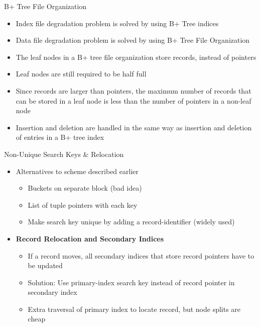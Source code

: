 \documentclass[aspectratio=169, xcolor=dvipsnames]{beamer}
\begin{document}
\begin{frame}{B+ Tree File Organization}
    \begin{itemize}[<+->]
        \item Index file degradation problem is solved by using B+ Tree indices
        \item Data file degradation problem is solved by using B+ Tree File Organization
        \item The leaf nodes in a B+ tree file organization store records, instead of pointers
        \item Leaf nodes are still required to be half full
        \item Since records are larger than pointers, the maximum number of records that can be stored in a leaf node is less than the number of pointers in a non-leaf node
        \item Insertion and deletion are handled in the same way as insertion and deletion of entries in a B+ tree index
    \end{itemize}
\end{frame}

\begin{frame}{Non-Unique Search Keys \& Relocation}
    \begin{itemize}[<+->]
        \item Alternatives to scheme described earlier
        \begin{itemize}
            \item Buckets on separate block (bad idea)
            \item List of tuple pointers with each key
            \item Make search key unique by adding a record-identifier (widely used)
        \end{itemize}
        \item \textbf{Record Relocation and Secondary Indices}
        \begin{itemize}
            \item If a record moves, all secondary indices that store record pointers have to be updated
            \item Solution: Use primary-index search key instead of record pointer in secondary index
            \item Extra traversal of primary index to locate record, but node splits are cheap
        \end{itemize}
    \end{itemize}
\end{frame}
\end{document}
